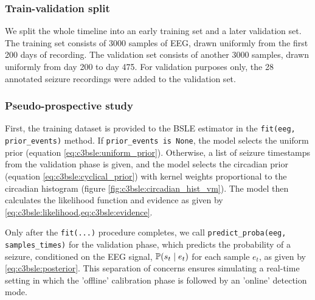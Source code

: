 \subsubsection{Train-validation split}
We split the whole timeline into an early training set and a later validation set. The training set consists of 3000 samples of EEG, drawn uniformly from the first 200 days of recording. The validation set consists of another 3000 samples, drawn uniformly from day 200 to day 475. For validation purposes only, the 28 annotated seizure recordings were added to the validation set. 


\subsubsection{Pseudo-prospective study}
First, the training dataset is provided to the BSLE estimator in the \texttt{fit(eeg, prior\_events)} method. If \texttt{prior\_events is None}, the model selects the uniform prior (equation \ref{eq:c3bsle:uniform_prior}). Otherwise, a list of seizure timestamps from the validation phase is given, and the model selects the circadian prior (equation \ref{eq:c3bsle:cyclical_prior}) with kernel weights proportional to the circadian histogram (figure \ref{fig:c3bsle:circadian_hist_vm}). The model then calculates the likelihood function and evidence as given by \cref{eq:c3bsle:likelihood,eq:c3bsle:evidence}.

Only after the \texttt{fit(...)} procedure completes, we call \texttt{predict\_proba(eeg, samples\_times)} for the validation phase, which predicts the probability of a seizure, conditioned on the EEG signal, $\mathbb{P}(s_t \mid e_t)$ for each sample $e_t$, as given by \cref{eq:c3bsle:posterior}. This separation of concerns ensures simulating a real-time setting in which the  'offline' calibration phase is followed by an 'online' detection mode.


